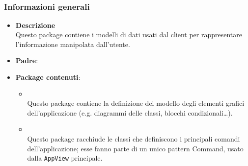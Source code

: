 \subsection{}
\label{\nogloxy{swedesigner::client::model}}
\subsubsection{Informazioni generali}
\begin{figure}[h]
\centering
{}
\caption{}
\end{figure}
\FloatBarrier
\begin{itemize}
\item \textbf{Descrizione}\\
Questo package contiene i modelli di dati usati dal client per rappresentare l'informazione manipolata dall'utente.
\item \textbf{Padre}: \hyperref[\nogloxy{swedesigner::client}]{}
\item \textbf{Package contenuti}:
\begin{itemize}
\item \hyperref[\nogloxy{swedesigner::client::model::celltypes}]{}\\
Questo package contiene la definizione del modello degli elementi grafici dell'applicazione (e.g. diagrammi delle classi, blocchi condizionali\dots). 
\item \hyperref[\nogloxy{swedesigner::client::model::utility}]{}\\
Questo package racchiude le classi che definiscono i principali comandi dell'applicazione; esse fanno parte di un unico pattern Command, usato dalla \texttt{AppView} principale.
\end{itemize}
\end{itemize}
